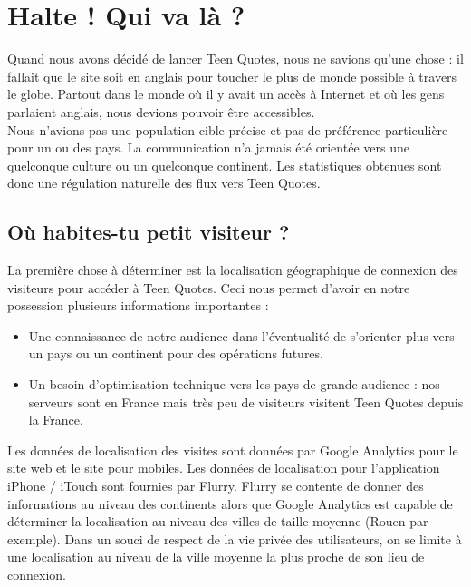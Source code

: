 \documentclass{report}
\begin{document}
	\chapter{Halte ! Qui va là ?}
	Quand nous avons décidé de lancer Teen Quotes, nous ne savions qu'une chose : il fallait que le site soit en anglais pour toucher le plus de monde possible à travers le globe. Partout dans le monde où il y avait un accès à Internet et où les gens parlaient anglais, nous devions pouvoir être accessibles.\\

	Nous n'avions pas une population cible précise et pas de préférence particulière pour un ou des pays. La communication n'a jamais été orientée vers une quelconque culture ou un quelconque continent. Les statistiques obtenues sont donc une régulation naturelle des flux vers Teen Quotes.

	\section{Où habites-tu petit visiteur ?}
	La première chose à déterminer est la localisation géographique de connexion des visiteurs pour accéder à Teen Quotes. Ceci nous permet d'avoir en notre possession plusieurs informations importantes :
	\vspace{10px}
	\begin{itemize}
		\item Une connaissance de notre audience dans l'éventualité de s'orienter plus vers un pays ou un continent pour des opérations futures.
		\item Un besoin d'optimisation technique vers les pays de grande audience : nos serveurs sont en France mais très peu de visiteurs visitent Teen Quotes depuis la France.
	\end{itemize}
	\vspace{10px}
	Les données de localisation des visites sont données par Google Analytics pour le site web et le site pour mobiles. Les données de localisation pour l'application iPhone / iTouch sont fournies par Flurry. Flurry se contente de donner des informations au niveau des continents alors que Google Analytics est capable de déterminer la localisation au niveau des villes de taille moyenne (Rouen par exemple). Dans un souci de respect de la vie privée des utilisateurs, on se limite à une localisation au niveau de la ville moyenne la plus proche de son lieu de connexion.\\
\end{document}
